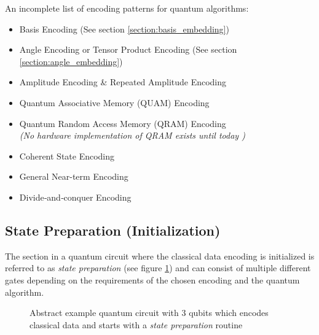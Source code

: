 \noindent An incomplete list of encoding patterns for quantum algorithms\cite{schuld2021supervised,Weigold2021_ExpandingDataEncodingPatterns,leymann2019pattern}: \label{list:encoding_patterns}
\begin{itemize}
    \item Basis Encoding (See section \ref{section:basis_embedding})
    \item Angle Encoding or Tensor Product Encoding (See section \ref{section:angle_embedding}) \cite{leymannBitterTruthGatebased2020}
    \item Amplitude Encoding \& Repeated Amplitude Encoding
    \item Quantum Associative Memory (QUAM) Encoding
    \item Quantum Random Access Memory (QRAM) Encoding \\\textit{(No hardware implementation of QRAM exists until today \cite{Weigold2021_ExpandingDataEncodingPatterns})}
    \item Coherent State Encoding
    \item General Near-term Encoding
    \item Divide‑and‑conquer Encoding \cite{araujoDivideandconquerAlgorithmQuantum2021}
\end{itemize}

\subsection{State Preparation (Initialization)}\label{subsection:state_preparation}

The section in a quantum circuit where the classical data encoding is initialized is referred to as \textit{state preparation}\cite{leymann2019pattern,Weigold2021_ExpandingDataEncodingPatterns} (see figure \ref{fig:circuit_state_preparation}) and can consist of multiple different gates depending on the requirements of the chosen encoding and the quantum algorithm. 

\begin{figure}[!h]
    \centering
    \caption{Abstract example quantum circuit with 3 qubits which encodes classical data and starts with a \textit{state preparation} routine}
    \label{fig:circuit_state_preparation}
\end{figure}


